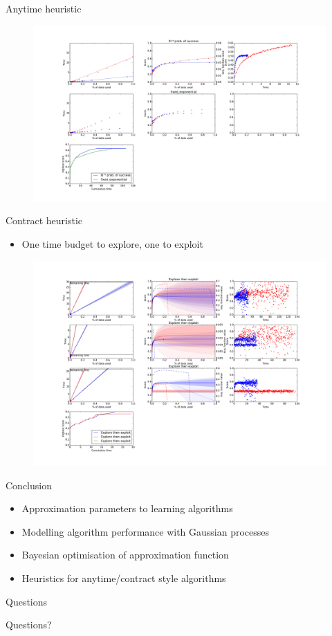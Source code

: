 \documentclass[handout]{beamer}
\begin{document}
\begin{frame}{Anytime heuristic}
\begin{figure}
\centering
  \includegraphics[trim=130 40 930 570,clip,width=.8\textwidth]{anytime1.pdf}
  \label{anytime1}
\end{figure}
\end{frame}

\begin{frame}{Contract heuristic}
\begin{itemize}
\item One time budget to explore, one to exploit	
\end{itemize}

\begin{figure}
\centering
  \includegraphics[trim=140 710 493 55,clip,width=\textwidth]{exp_then_exp3.pdf}

  \label{sched:exp_then_exp3}
\end{figure}
\end{frame}

\begin{frame}{Conclusion}
\begin{itemize}
\item<1-> Approximation parameters to learning algorithms
\item<2-> Modelling algorithm performance with Gaussian processes
\item<3-> Bayesian optimisation of approximation function
\item<4-> Heuristics for anytime/contract style algorithms
\end{itemize}
\end{frame}


\begin{frame}{Questions}

\begin{center}
\Huge Questions?
\end{center}

\end{frame}
\end{document}

